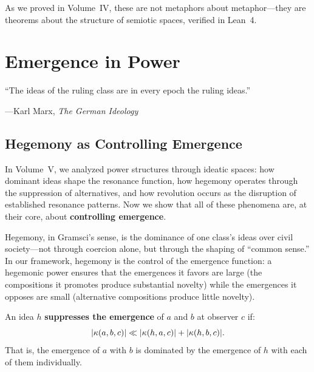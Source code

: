 As we proved in Volume~IV, these are not metaphors about metaphor---they are
theorems about the structure of semiotic spaces, verified in Lean~4.



\chapter{Emergence in Power}
\label{ch:emergence-power}

\epigraph{``The ideas of the ruling class are in every epoch the ruling ideas.''}
{---Karl Marx, \emph{The German Ideology}}


\section{Hegemony as Controlling Emergence}

In Volume~V, we analyzed power structures through ideatic spaces: how dominant
ideas shape the resonance function, how hegemony operates through the
suppression of alternatives, and how revolution occurs as the disruption of
established resonance patterns. Now we show that all of these phenomena are,
at their core, about \textbf{controlling emergence}.

Hegemony, in Gramsci's sense, is the dominance of one class's ideas over
civil society---not through coercion alone, but through the shaping of
``common sense.'' In our framework, hegemony is the control of the emergence
function: a hegemonic power ensures that the emergences it favors are large
(the compositions it promotes produce substantial novelty) while the emergences
it opposes are small (alternative compositions produce little novelty).

\begin{definition}
\label{def:emergence-suppression}
An idea $h$ \textbf{suppresses the emergence} of $a$ and $b$ at observer $c$ if:
\[
  |\kappa(a, b, c)| \ll |\kappa(h, a, c)| + |\kappa(h, b, c)|.
\]
That is, the emergence of $a$ with $b$ is dominated by the emergence of $h$
with each of them individually.
\end{definition}

